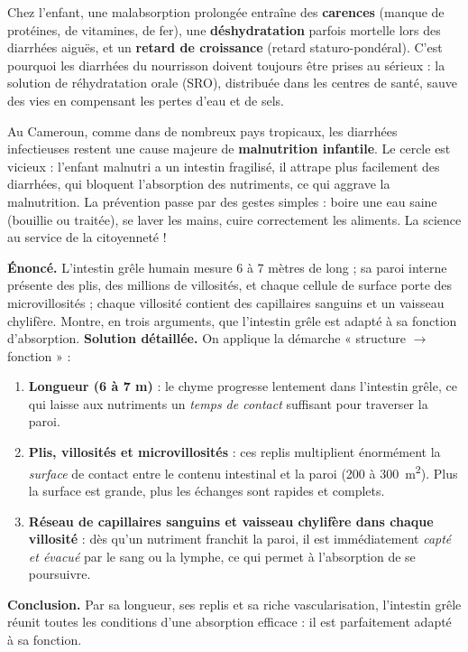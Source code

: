 \documentclass[11pt]{article}
\begin{document}
\begin{attention}
Chez l'enfant, une malabsorption prolongée entraîne des \textbf{carences} (manque de protéines, de vitamines, de fer), une \textbf{déshydratation} parfois mortelle lors des diarrhées aiguës, et un \textbf{retard de croissance} (retard staturo-pondéral). C'est pourquoi les diarrhées du nourrisson doivent toujours être prises au sérieux : la solution de réhydratation orale (SRO), distribuée dans les centres de santé, sauve des vies en compensant les pertes d'eau et de sels.
\end{attention}

\begin{savaistu}
Au Cameroun, comme dans de nombreux pays tropicaux, les diarrhées infectieuses restent une cause majeure de \textbf{malnutrition infantile}. Le cercle est vicieux : l'enfant malnutri a un intestin fragilisé, il attrape plus facilement des diarrhées, qui bloquent l'absorption des nutriments, ce qui aggrave la malnutrition. La prévention passe par des gestes simples : boire une eau saine (bouillie ou traitée), se laver les mains, cuire correctement les aliments. La science au service de la citoyenneté !
\end{savaistu}

\begin{exoresolu}
\textbf{Énoncé.} L'intestin grêle humain mesure 6 à 7 mètres de long ; sa paroi interne présente des plis, des millions de villosités, et chaque cellule de surface porte des microvillosités ; chaque villosité contient des capillaires sanguins et un vaisseau chylifère. Montre, en trois arguments, que l'intestin grêle est adapté à sa fonction d'absorption.
\tcblower
\textbf{Solution détaillée.} On applique la démarche « structure $\rightarrow$ fonction » :
\begin{enumerate}
\item \textbf{Longueur (6 à 7 m)} : le chyme progresse lentement dans l'intestin grêle, ce qui laisse aux nutriments un \emph{temps de contact} suffisant pour traverser la paroi.
\item \textbf{Plis, villosités et microvillosités} : ces replis multiplient énormément la \emph{surface} de contact entre le contenu intestinal et la paroi (200 à \SI{300}{m^2}). Plus la surface est grande, plus les échanges sont rapides et complets.
\item \textbf{Réseau de capillaires sanguins et vaisseau chylifère dans chaque villosité} : dès qu'un nutriment franchit la paroi, il est immédiatement \emph{capté et évacué} par le sang ou la lymphe, ce qui permet à l'absorption de se poursuivre.
\end{enumerate}
\textbf{Conclusion.} Par sa longueur, ses replis et sa riche vascularisation, l'intestin grêle réunit toutes les conditions d'une absorption efficace : il est parfaitement adapté à sa fonction.
\end{exoresolu}
\end{document}
